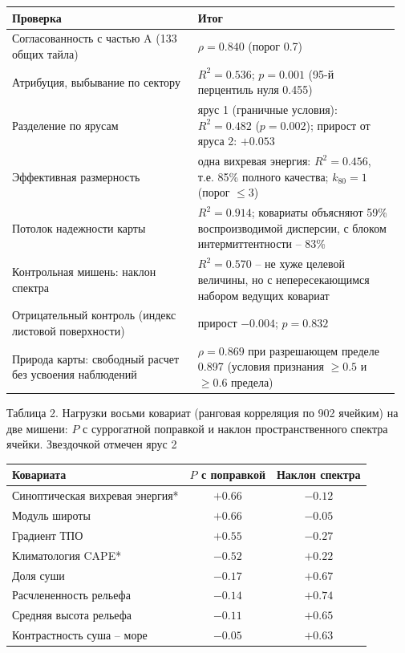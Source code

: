 \documentclass[12pt,a4paper]{article}
\begin{document}
\begin{singlespace}
\noindent\begin{tabular}{@{}p{0.46\linewidth}p{0.50\linewidth}@{}}
\toprule
Проверка & Итог\\
\midrule
Согласованность с частью A (133 общих тайла) & $\rho = 0.840$ (порог 0.7)\\
Атрибуция, выбывание по сектору & $R^2 = 0.536$; $p = 0.001$ (95-й перцентиль нуля 0.455)\\
Разделение по ярусам & ярус 1 (граничные условия): $R^2 = 0.482$ ($p = 0.002$); прирост от яруса 2: $+0.053$\\
Эффективная размерность & одна вихревая энергия: $R^2 = 0.456$, т.е. 85\% полного качества; $k_{80} = 1$ (порог $\le 3$)\\
Потолок надежности карты & $R^2 = 0.914$; ковариаты объясняют 59\% воспроизводимой дисперсии, с блоком интермиттентности -- 83\%\\
Контрольная мишень: наклон спектра & $R^2 = 0.570$ -- не хуже целевой величины, но с непересекающимся набором ведущих ковариат\\
Отрицательный контроль (индекс листовой поверхности) & прирост $-0.004$; $p = 0.832$\\
Природа карты: свободный расчет без усвоения наблюдений & $\rho = 0.869$ при разрешающем пределе 0.897 (условия признания $\ge 0.5$ и $\ge 0.6$ предела)\\
\bottomrule
\end{tabular}
\end{singlespace}

\clearpage
\noindent Таблица 2. Нагрузки восьми ковариат (ранговая корреляция по 902 ячейким) на две мишени: $P$ с суррогатной поправкой и наклон пространственного спектра ячейки. Звездочкой отмечен ярус 2

\begin{singlespace}
\noindent\begin{tabular}{@{}lcc@{}}
\toprule
Ковариата & $P$ с поправкой & Наклон спектра\\
\midrule
Синоптическая вихревая энергия* & $+0.66$ & $-0.12$\\
Модуль широты & $+0.66$ & $-0.05$\\
Градиент ТПО & $+0.55$ & $-0.27$\\
Климатология CAPE* & $-0.52$ & $+0.22$\\
Доля суши & $-0.17$ & $+0.67$\\
Расчлененность рельефа & $-0.14$ & $+0.74$\\
Средняя высота рельефа & $-0.11$ & $+0.65$\\
Контрастность суша -- море & $-0.05$ & $+0.63$\\
\bottomrule
\end{tabular}
\end{singlespace}
\end{document}
